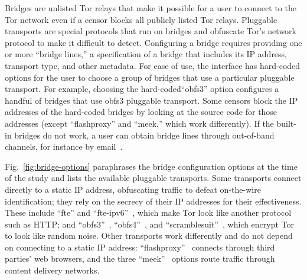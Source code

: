 \documentclass[USenglish,oneside,twocolumn]{article}
\begin{document}
Bridges are unlisted Tor relays that make it possible for a user to connect
to the Tor network even if a censor blocks all publicly listed Tor relays.
Pluggable transports are special protocols that run on bridges and obfuscate
Tor's network protocol to make it difficult to detect. 
Configuring a bridge requires providing one or more
``bridge lines,'' a specification of a bridge that
includes its IP address, transport type, and other metadata.
For ease of use, the interface has hard-coded options for 
the user to choose a group of bridges that use a particular
pluggable transport. For example, choosing  the hard-coded``obfs3'' option
configures a handful of bridges that use obfs3 pluggable transport.
Some censors block the IP addresses of the hard-coded bridges by looking
at the source code for those addresses (except ``flashproxy'' and ``meek,'' which work differently).
If the built-in bridges do not work, a user can obtain bridge lines
through out-of-band channels, for instance by email~\cite{bridgedb}.

Fig.~\ref{fig:bridge-options} paraphrases the bridge configuration
options at the time of the study and lists the available pluggable transports.
Some transports connect directly to a static IP address,
obfuscating traffic to defeat on-the-wire identification;
they rely on the secrecy of their IP addresses for their effectiveness.
These include ``fte'' and ``fte-ipv6''~\cite{fte},
which make Tor look like another protocol such as HTTP; and
``obfs3''~\cite{obfs3}, ``obfs4''~\cite{obfs4}, and ``scramblesuit''~\cite{scramblesuit},
which encrypt Tor to look like random noise.
Other transports work differently and do not depend on connecting to a static IP address:
``flashproxy''~\cite{flashproxy} connects through third parties' web browsers,
and the three ``meek''~\cite{fifield2015blocking} options route traffic
through content delivery networks.
\end{document}
